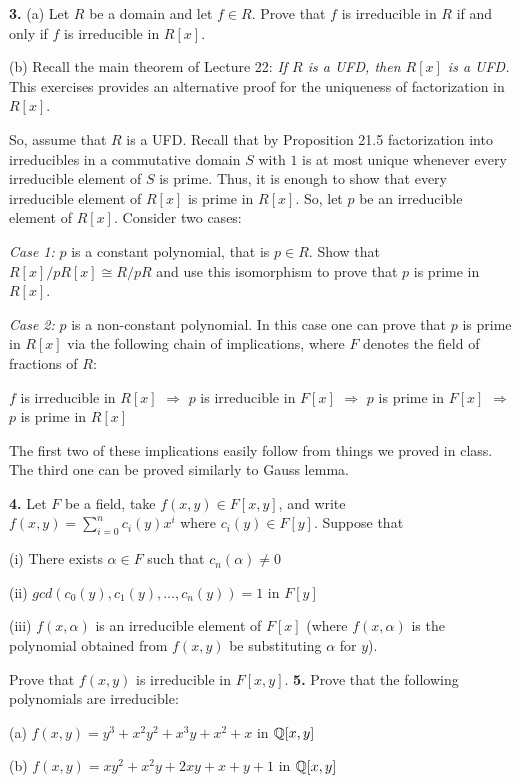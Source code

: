 \documentclass[12pt]{article}
\begin{document}
{\bf 3.} (a) Let $R$ be a domain and let $f\in R$. Prove that $f$ is irreducible in $R$ if and only if $f$ is irreducible in $R[x]$.
\skv

(b) Recall the main theorem of Lecture 22: {\it If $R$ is a UFD, then $R[x]$ is a UFD.}
This exercises provides an  alternative proof for the uniqueness of factorization in $R[x]$.

So, assume that $R$ is a UFD. Recall that by Proposition 21.5 factorization into irreducibles
in a commutative domain $S$ with $1$ is at most unique whenever every irreducible element
of $S$ is prime. Thus, it is enough to show that every irreducible element of $R[x]$ is prime in $R[x]$.
So, let $p$ be an irreducible element of $R[x]$.
Consider two cases:

{\it Case 1:} $p$ is a constant polynomial, that is $p\in R$. Show that $R[x]/ p R[x]\cong R/pR$
and use this isomorphism to prove that $p$ is prime in $R[x]$.


{\it Case 2:} $p$ is a non-constant polynomial. In this case one can prove that $p$ is prime in $R[x]$
via the following chain of implications, where $F$ denotes the field of fractions of $R$:

$f$ is irreducible in $R[x]$ $\Rightarrow$ $p$ is irreducible in $F[x]$ $\Rightarrow$ $p$ is prime in $F[x]$  
$\Rightarrow$ $p$ is prime in $R[x]$

The first two of these implications easily follow from things we proved in class. The third one can be proved
similarly to Gauss lemma.


\skv
{\bf 4.} Let $F$ be a field, take $f(x,y)\in F[x,y]$, and write $f(x,y)=\sum_{i=0}^n c_i(y) x^i$
where $c_i(y)\in F[y]$. Suppose that 

\sk (i) There exists $\alpha\in F$ such that $c_n(\alpha)\neq 0$

\sk (ii) $gcd(c_0(y), c_1(y),\ldots, c_n(y))=1$ in $F[y]$

\sk (iii) $f(x,\alpha)$ is an irreducible element of $F[x]$ (where $f(x,\alpha)$ is the polynomial
obtained from $f(x,y)$ be substituting $\alpha$ for $y$). 

Prove that $f(x,y)$ is irreducible in $F[x,y]$.
\skv
{\bf 5.} Prove that the following polynomials are irreducible:

(a) $f(x,y)=y^3+x^2 y^2+x^3y+x^2+x$ in ${\mathbb Q}[x,y]$

(b) $f(x,y)=xy^2+x^2y+2xy+x+y+1$ in ${\mathbb Q}[x,y]$
\end{document}
